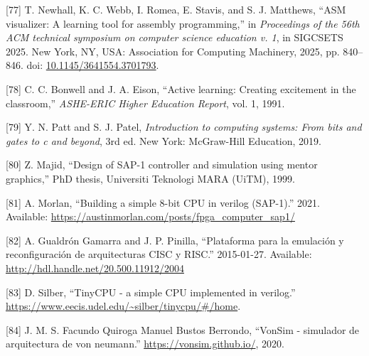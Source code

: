 \documentclass[12pt,oneside]{templates/unerthesis}
\newcommand{\CSLLeftMargin}[1]{#1} %
\newcommand{\CSLRightInline}[1]{#1} %
\newlength{\cslhangindent}
\newenvironment{CSLReferences}[2] %
 {\setlength{\parindent}{0pt}%
  \setlength{\leftskip}{#1 pt\relax}%
  \setlength{\parskip}{#2 pt\relax}%
  \everypar{\setlength{\hangindent}{\cslhangindent}}}
 {\par}
\begin{document}
\begin{CSLReferences}{0}{0}
\leavevmode{}%
\CSLLeftMargin{{[}77{]} }%
\CSLRightInline{T. Newhall, K. C. Webb, I. Romea, E. Stavis, and S. J. Matthews, {``ASM visualizer: A learning tool for assembly programming,''} in \emph{Proceedings of the 56th ACM technical symposium on computer science education v. 1}, in SIGCSETS 2025. New York, NY, USA: Association for Computing Machinery, 2025, pp. 840--846. doi: \href{https://doi.org/10.1145/3641554.3701793}{10.1145/3641554.3701793}.}

\leavevmode{}%
\CSLLeftMargin{{[}78{]} }%
\CSLRightInline{C. C. Bonwell and J. A. Eison, {``Active learning: Creating excitement in the classroom,''} \emph{ASHE-ERIC Higher Education Report}, vol. 1, 1991.}

\leavevmode{}%
\CSLLeftMargin{{[}79{]} }%
\CSLRightInline{Y. N. Patt and S. J. Patel, \emph{Introduction to computing systems: From bits and gates to c and beyond}, 3rd ed. New York: McGraw-Hill Education, 2019.}

\leavevmode{}%
\CSLLeftMargin{{[}80{]} }%
\CSLRightInline{Z. Majid, {``Design of SAP-1 controller and simulation using mentor graphics,''} PhD thesis, Universiti Teknologi MARA (UiTM), 1999.}

\leavevmode{}%
\CSLLeftMargin{{[}81{]} }%
\CSLRightInline{A. Morlan, {``Building a simple 8-bit CPU in verilog (SAP-1).''} 2021. Available: \url{https://austinmorlan.com/posts/fpga_computer_sap1/}}

\leavevmode{}%
\CSLLeftMargin{{[}82{]} }%
\CSLRightInline{A. Gualdrón Gamarra and J. P. Pinilla, {``Plataforma para la emulación y reconfiguración de arquitecturas CISC y RISC.''} 2015-01-27. Available: \url{http://hdl.handle.net/20.500.11912/2004}}

\leavevmode{}%
\CSLLeftMargin{{[}83{]} }%
\CSLRightInline{D. Silber, {``TinyCPU - a simple CPU implemented in verilog.''} \url{https://www.eecis.udel.edu/~silber/tinycpu/\#/home}.}

\leavevmode{}%
\CSLLeftMargin{{[}84{]} }%
\CSLRightInline{J. M. S. Facundo Quiroga Manuel Bustos Berrondo, {``VonSim - simulador de arquitectura de von neumann.''} \url{https://vonsim.github.io/}, 2020.}


\end{CSLReferences}
\end{document}
